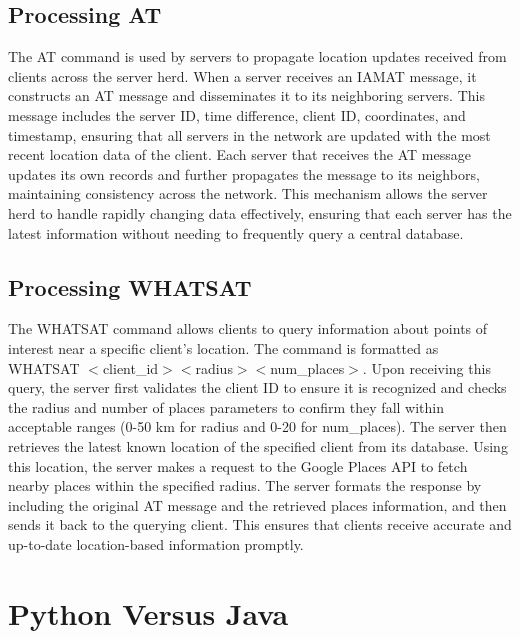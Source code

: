 \documentclass[letterpaper,twocolumn,10pt]{article}
\begin{document}
\subsection{Processing AT}
\noindent{}The AT command is used by servers to propagate location updates received from clients across the server herd. When a server receives an IAMAT message, it constructs an AT message and disseminates it to its neighboring servers. This message includes the server ID, time difference, client ID, coordinates, and timestamp, ensuring that all servers in the network are updated with the most recent location data of the client. Each server that receives the AT message updates its own records and further propagates the message to its neighbors, maintaining consistency across the network. This mechanism allows the server herd to handle rapidly changing data effectively, ensuring that each server has the latest information without needing to frequently query a central database.

\subsection{Processing WHATSAT}
\noindent{}The WHATSAT command allows clients to query information about points of interest near a specific client's location. The command is formatted as WHATSAT $<$client\_id$><$radius$> <$num\_places$>$. Upon receiving this query, the server first validates the client ID to ensure it is recognized and checks the radius and number of places parameters to confirm they fall within acceptable ranges (0-50 km for radius and 0-20 for num\_places). The server then retrieves the latest known location of the specified client from its database. Using this location, the server makes a request to the Google Places API to fetch nearby places within the specified radius. The server formats the response by including the original AT message and the retrieved places information, and then sends it back to the querying client. This ensures that clients receive accurate and up-to-date location-based information promptly.

\section{Python Versus Java}
\end{document}
